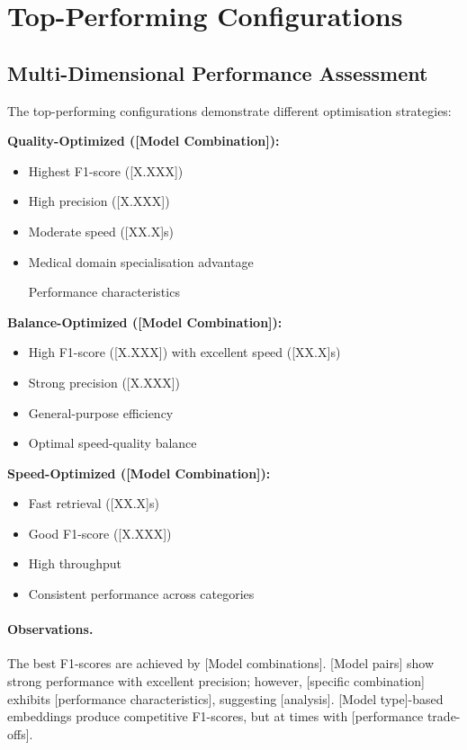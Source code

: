 \section{Top-Performing Configurations}



\subsection{Multi-Dimensional Performance Assessment}

The top-performing configurations demonstrate different optimisation strategies:

\textbf{Quality-Optimized ([Model Combination]):}
\begin{itemize}
    \item Highest F1-score ([X.XXX])
    \item High precision ([X.XXX])
    \item Moderate speed ([XX.X]s)
    \item Medical domain specialisation advantage
    \item [Performance characteristics]
\end{itemize}

\textbf{Balance-Optimized ([Model Combination]):}
\begin{itemize}
    \item High F1-score ([X.XXX]) with excellent speed ([XX.X]s)
    \item Strong precision ([X.XXX])
    \item General-purpose efficiency
    \item Optimal speed-quality balance
\end{itemize}

\textbf{Speed-Optimized ([Model Combination]):}
\begin{itemize}
    \item Fast retrieval ([XX.X]s)
    \item Good F1-score ([X.XXX])
    \item High throughput
    \item Consistent performance across categories
\end{itemize}

\paragraph{Observations.} The best F1-scores are achieved by [Model combinations]. [Model pairs] show strong performance with excellent precision; however, [specific combination] exhibits [performance characteristics], suggesting [analysis]. [Model type]-based embeddings produce competitive F1-scores, but at times with [performance trade-offs].

